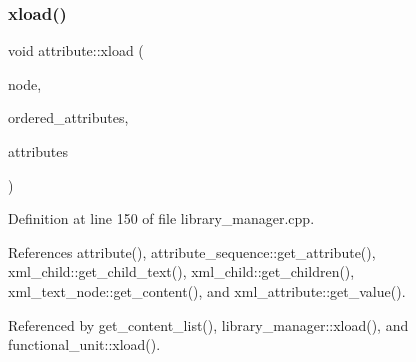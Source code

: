 \subsubsection{\texorpdfstring{xload()}{xload()}}
{\footnotesize\ttfamily void attribute\+::xload (\begin{DoxyParamCaption}\item[{const \hyperlink{classxml__element}{xml\+\_\+element} $\ast$}]{node,  }\item[{std\+::vector$<$ std\+::string $>$ \&}]{ordered\+\_\+attributes,  }\item[{std\+::map$<$ std\+::string, \hyperlink{library__manager_8hpp_a46399d2eacc03fb10f84fb33987ab8e3}{attribute\+Ref} $>$ \&}]{attributes }\end{DoxyParamCaption})\hspace{0.3cm}{\ttfamily [static]}}



Definition at line 150 of file library\+\_\+manager.\+cpp.



References attribute(), attribute\+\_\+sequence\+::get\+\_\+attribute(), xml\+\_\+child\+::get\+\_\+child\+\_\+text(), xml\+\_\+child\+::get\+\_\+children(), xml\+\_\+text\+\_\+node\+::get\+\_\+content(), and xml\+\_\+attribute\+::get\+\_\+value().



Referenced by get\+\_\+content\+\_\+list(), library\+\_\+manager\+::xload(), and functional\+\_\+unit\+::xload().


